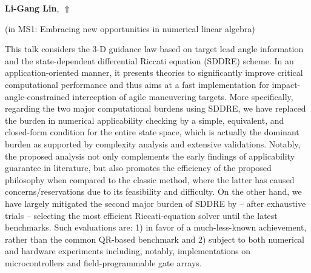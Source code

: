 \documentclass[ILAS2025-program.tex]{subfiles}
\begin{document}
     \hypertarget{down0072}{}\begin{ilasabstract}
    
    \textbf{Li-Gang Lin},  \hfill \hyperlink{up0072}{$\Uparrow$}
    
    (in {\color{mstitle}MS1: Embracing new opportunities in numerical linear algebra})
        
        \mtskip
    This talk considers the 3-D guidance law based on target lead angle information and the state-dependent differential Riccati equation (SDDRE) scheme. In an application-oriented manner, it presents theories to significantly improve critical computational performance and thus aims at a fast implementation for impact-angle-constrained interception of agile maneuvering targets. More specifically, regarding the two major computational burdens using SDDRE, we have replaced the burden in numerical applicability checking by a simple, equivalent, and closed-form condition for the entire state space, which is actually the dominant burden as supported by complexity analysis and extensive validations. Notably, the proposed analysis not only complements the early findings of applicability guarantee in literature, but also promotes the efficiency of the proposed philosophy when compared to the classic method, where the latter has caused concerns/reservations due to its feasibility and difficulty. On the other hand, we have largely mitigated the second major burden of SDDRE by -- after exhaustive trials -- selecting the most efficient Riccati-equation solver until the latest benchmarks. Such evaluations are: 1) in favor of a much-less-known achievement, rather than the common QR-based benchmark and 2) subject to both numerical and hardware experiments including, notably, implementations on microcontrollers and field-programmable gate arrays.
\end{ilasabstract}
\end{document}
